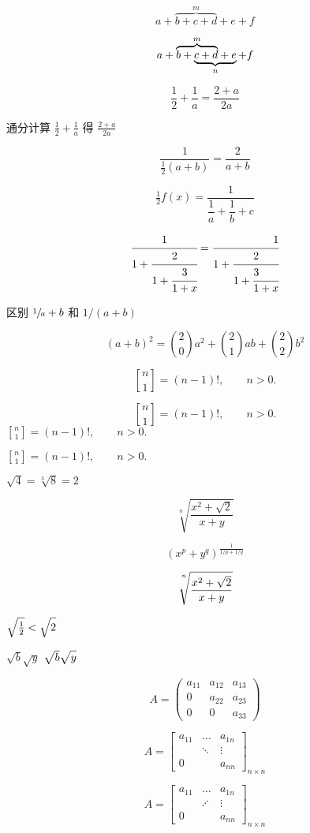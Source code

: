 \documentclass{ctexart}
\newcommand\stiring[2]{\genfrac{[}{]}{0pt}{}{#1}{#2}}
\newcommand\dstiring[2]{\genfrac{[}{]}{0pt}{0}{#1}{#2}}
\newcommand\tstiring[2]{\genfrac{[}{]}{0pt}{1}{#1}{#2}}
\begin{document}
\[ a + \overbrace{b+c+d}^{m} + e + f \]

\[ a + \rlap{$\overbrace{\phantom{b + c + d}}^{m}$} b + \underbrace{c + d + e}_{n} + f \]

\[ \frac 12 + \frac 1a = \frac{2+a}{2a} \]

通分计算 $\frac 12 + \frac 1a$ 得 $\frac{2+a}{2a}$

\[ \frac{1}{\frac 12 (a+b)} = \frac{2}{a+b} \]

\[ \tfrac 12 f(x) =
\frac{1}{\dfrac 1a + \dfrac 1b + c}
\]

\[ \cfrac{1}{1+\cfrac{2}{1 + \cfrac{3}{1+x}}} = \cfrac[r]{1}{1+\cfrac{2}{1+\cfrac[l]{3}{1+x}}} \]

区别 $\sfrac 1a + b$ 和 $1/(a+b)$

\[
(a+b)^2 = \binom 20 a^2 + \binom 21 ab + \binom 22 b^2
\]

\[
\genfrac{[}{]}{0pt}{}{n}{1} = (n-1)!,
\qquad n > 0.
\]

\[ \stiring{n}{1} = (n-1)!, \qquad n > 0. \]
$\dstiring{n}{1} = (n-1)!, \qquad n > 0.$

$\tstiring{n}{1} = (n-1)!, \qquad n > 0.$

$\sqrt 4 = \sqrt[3]{8} = 2$

\[
\sqrt[n]{\frac{x^2 + \sqrt 2}{x+y}}
\]

\[
(x^p + y^q)^{\frac{1}{1/p+1/q}}
\]

\[
\sqrt[\uproot{16}\leftroot{-2}n]{\frac{x^2 + \sqrt 2}{x+y}}
\]

$\sqrt{\frac 12} < \sqrt{\vphantom{\frac12}2}$

$\sqrt b \sqrt y$ \qquad
$\sqrt{\mathstrut b} \sqrt{\mathstrut y}$

\[
A = \begin{pmatrix}
  a_{11} & a_{12} & a_{13} \\
  0 & a_{22} & a_{23} \\
  0 & 0 & a_{33}
\end{pmatrix}
\]

\[
A = \begin{bmatrix}
  a_{11} & \dots & a_{1n} \\
  & \ddots & \vdots \\
  0 & & a_{nn}
\end{bmatrix}_{n\times n}
\]

\[
A = \begin{bmatrix}
  a_{11} & \dots & a_{1n} \\
  & \iddots & \vdots \\
  0 & & a_{nn}
\end{bmatrix}_{n\times n}
\]
\end{document}
